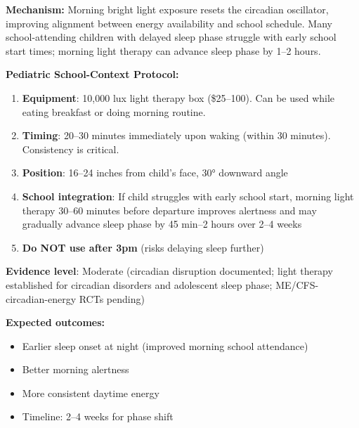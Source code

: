 \begin{recommendation}
\label{rec:circadian-light-ped-ambulatory}

\textbf{Mechanism:} Morning bright light exposure resets the circadian oscillator, improving alignment between energy availability and school schedule. Many school-attending children with delayed sleep phase struggle with early school start times; morning light therapy can advance sleep phase by 1--2 hours.

\textbf{Pediatric School-Context Protocol:}

\begin{enumerate}
    \item \textbf{Equipment}: 10,000 lux light therapy box (\$25--100). Can be used while eating breakfast or doing morning routine.

    \item \textbf{Timing}: 20--30 minutes immediately upon waking (within 30 minutes). Consistency is critical.

    \item \textbf{Position}: 16--24 inches from child's face, 30° downward angle

    \item \textbf{School integration}: If child struggles with early school start, morning light therapy 30--60 minutes before departure improves alertness and may gradually advance sleep phase by 45 min--2 hours over 2--4 weeks

    \item \textbf{Do NOT use after 3pm} (risks delaying sleep further)
\end{enumerate}

\textbf{Evidence level}: Moderate (circadian disruption documented; light therapy established for circadian disorders and adolescent sleep phase; ME/CFS-circadian-energy RCTs pending)

\textbf{Expected outcomes:}
\begin{itemize}
    \item Earlier sleep onset at night (improved morning school attendance)
    \item Better morning alertness
    \item More consistent daytime energy
    \item Timeline: 2--4 weeks for phase shift
\end{itemize}

\end{recommendation}

